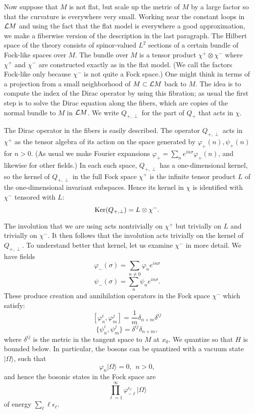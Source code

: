 Now suppose that $M$ is not flat, but scale up the metric of $M$ by a large
factor so that the curvature is everywhere very small.  Working near
the constant loops in ${\cal L}M$ and using the fact that the flat
model is everywhere a good approximation, we make a fiberwise version of
the description in the last paragraph.
The Hilbert
space of the theory consists of spinor-valued $L^2$ sections of a certain
bundle  of Fock-like spaces over $M$. The bundle over $M$
is a tensor product $\chi^+\otimes \chi^-$ where $\chi^+$ and $\chi^-$ are
constructed exactly as in the flat model.  (We call the factors Fock-like
only because $\chi^-$ is not quite a Fock space.)
One might think in terms of a projection from a small neighborhood
of $M\subset {\cal L}M$ back to $M$.  The idea is to compute the 
index of the Dirac operator by using this fibration; as usual the first
step is to solve the Dirac equation along the fibers, which are copies
of the normal bundle to $M$ in ${\cal L}M$.  We write
$Q_{+,\perp}$ for the part of $Q_+$ that acts in $\chi$.

The Dirac operator in the fibers is easily described.
The operator $Q_{+,\perp}$ acts in $\chi^+$  as the tensor algebra of its
action on the space generated by
 $\varphi_+(n),\psi_+(n)$ for $n>0$.  (As usual
we make Fourier expansions $\varphi_+=\sum_ne^{in\sigma}\varphi_+(n)$, and
likewise for other fields.)   In each such space, $Q_{+,\perp}$ 
has a one-dimensional
kernel,
so the kernel of $Q_{+,\perp}$ 
in the full Fock space $\chi^+$ is the infinite tensor
product $L$ of the one-dimensional invariant subspaces.
Hence its kernel in $\chi$ is identified with $\chi^-$ tensored with $L$:
$${\rm Ker}(Q_{+,\perp})=L\otimes \chi^-.$$

The involution that we are using acts nontrivially on $\chi^+$ but
trivially on $L$ and
trivially on $\chi^-$. It then follows that the involution acts
trivially on the kernel of $Q_{+,\perp}$.
To understand better that kernel,
let us examine $\chi^-$ in more detail. We have fields
$$\varphi_-(\sigma)=\sum_{n\not= 0}\varphi_ne^{in\sigma}$$
$$\psi_-(\sigma)=\sum_n\psi_ne^{in\sigma}.$$
These produce creation and annihilation operators in the Fock space
$\chi^-$ which satisfy:
$$[\varphi_n^i,\varphi_m^j]=\frac{1}{m}\delta_{n+m}\delta^{ij}$$
$$\{\psi_n^i,\psi_m^j\}=\delta^{ij}\delta_{n+m},$$
where $\delta^{ij}$ is the metric in the tangent space to $M$ at
$x_0$. 
We quantize so that $H$ is bounded below.  In particular, the bosons
can be quantized  with a vacuum state
$|\Omega\rangle$, such that
$$\varphi_n|\Omega\rangle =0, \ \ n>0,$$
and hence the bosonic states in the Fock space are
$$\prod_{\ell=1}^\infty\varphi_{-\ell}^{\epsilon_\ell}|\Omega\rangle$$
of energy $\sum_\ell\ell\epsilon_\ell$.


